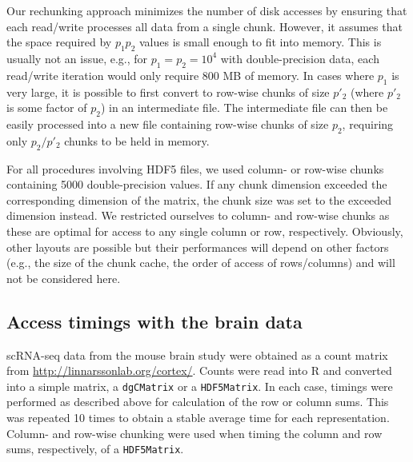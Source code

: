 \documentclass[10pt,letterpaper]{article}
\newcommand{\code}[1]{\texttt{#1}}
\begin{document}
Our rechunking approach minimizes the number of disk accesses by ensuring that each read/write processes all data from a single chunk.
However, it assumes that the space required by $p_1p_2$ values is small enough to fit into memory. 
This is usually not an issue, e.g., for $p_1=p_2=10^4$ with double-precision data, each read/write iteration would only require 800 MB of memory.
In cases where $p_1$ is very large, it is possible to first convert to row-wise chunks of size $p'_2$ (where $p'_2$ is some factor of $p_2$) in an intermediate file.
The intermediate file can then be easily processed into a new file containing row-wise chunks of size $p_2$, requiring only $p_2/p'_2$ chunks to be held in memory.

For all procedures involving HDF5 files, we used column- or row-wise chunks containing 5000 double-precision values.
If any chunk dimension exceeded the corresponding dimension of the matrix, the chunk size was set to the exceeded dimension instead.
We restricted ourselves to column- and row-wise chunks as these are optimal for access to any single column or row, respectively.
Obviously, other layouts are possible but their performances will depend on other factors (e.g., the size of the chunk cache, the order of access of rows/columns) and will not be considered here.

\subsection*{Access timings with the brain data}
scRNA-seq data from the mouse brain study \cite{zeisel2015brain} were obtained as a count matrix from \url{http://linnarssonlab.org/cortex/}.
Counts were read into R and converted into a simple matrix, a \code{dgCMatrix} or a \code{HDF5Matrix}.
In each case, timings were performed as described above for calculation of the row or column sums.
This was repeated 10 times to obtain a stable average time for each representation.
Column- and row-wise chunking were used when timing the column and row sums, respectively, of a \code{HDF5Matrix}.

{\small
    
    
}
\end{document}
